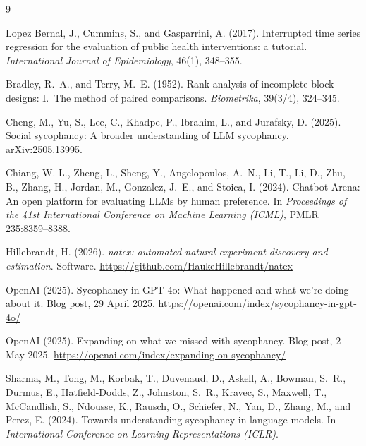 \documentclass[11pt]{article}
\begin{document}
\footnotesize
\begin{thebibliography}{9}
\setlength{\itemsep}{2pt}\setlength{\parskip}{0pt}

Lopez Bernal, J., Cummins, S., and Gasparrini, A. (2017).
Interrupted time series regression for the evaluation of public health
interventions: a tutorial.
\emph{International Journal of Epidemiology}, 46(1), 348--355.

Bradley, R.~A., and Terry, M.~E. (1952).
Rank analysis of incomplete block designs: I.\ The method of paired
comparisons.
\emph{Biometrika}, 39(3/4), 324--345.

Cheng, M., Yu, S., Lee, C., Khadpe, P., Ibrahim, L., and Jurafsky, D. (2025).
Social sycophancy: A broader understanding of LLM sycophancy.
arXiv:2505.13995.

Chiang, W.-L., Zheng, L., Sheng, Y., Angelopoulos, A.~N., Li, T., Li, D.,
Zhu, B., Zhang, H., Jordan, M., Gonzalez, J.~E., and Stoica, I. (2024).
Chatbot Arena: An open platform for evaluating LLMs by human preference.
In \emph{Proceedings of the 41st International Conference on Machine
Learning (ICML)}, PMLR 235:8359--8388.

Hillebrandt, H. (2026).
\emph{natex: automated natural-experiment discovery and estimation}.
Software. \url{https://github.com/HaukeHillebrandt/natex}

OpenAI (2025).
Sycophancy in GPT-4o: What happened and what we're doing about it.
Blog post, 29 April 2025.
\url{https://openai.com/index/sycophancy-in-gpt-4o/}

OpenAI (2025).
Expanding on what we missed with sycophancy.
Blog post, 2 May 2025.
\url{https://openai.com/index/expanding-on-sycophancy/}

Sharma, M., Tong, M., Korbak, T., Duvenaud, D., Askell, A., Bowman, S.~R.,
Durmus, E., Hatfield-Dodds, Z., Johnston, S.~R., Kravec, S., Maxwell, T.,
McCandlish, S., Ndousse, K., Rausch, O., Schiefer, N., Yan, D., Zhang, M.,
and Perez, E. (2024).
Towards understanding sycophancy in language models.
In \emph{International Conference on Learning Representations (ICLR)}.

\end{thebibliography}
\end{document}
